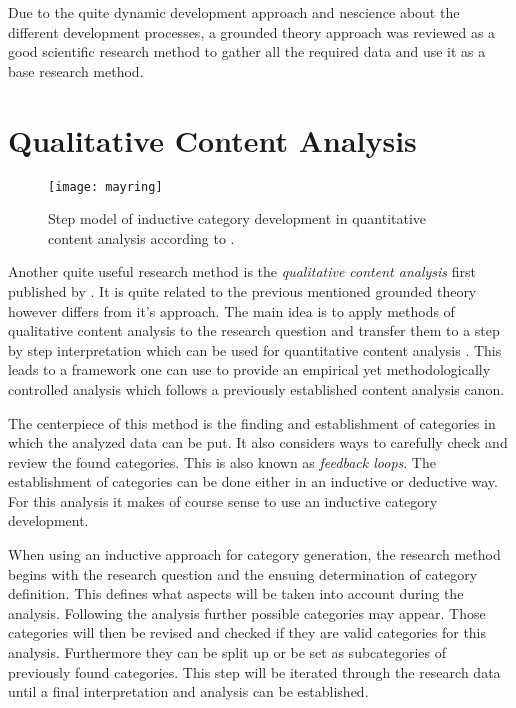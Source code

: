 Due to the quite dynamic development approach and nescience about the different
development processes, a grounded theory approach was reviewed as a good
scientific research method to gather all the required data and use it as a base
research method.


\section{Qualitative Content Analysis} %

\begin{figure}[htbp]
  \centering
  \texttt{[image: mayring]}
  \caption{Step model of inductive category development in quantitative content
    analysis according to \citeauthor{Mayring2008} \cite{Mayring2000,Mayring2008}.}
\end{figure}

Another quite useful research method is the \emph{qualitative content analysis}
first published by \textcite{Mayring2008}. It is quite related to the previous
mentioned grounded theory however differs from it's approach. The main idea is
to apply methods of qualitative content analysis to the research question and
transfer them to a step by step interpretation which can be used for
quantitative content analysis \cite{Mayring2000}. This leads to a framework one
can use to provide an empirical yet methodologically controlled analysis which
follows a previously established content analysis canon.

The centerpiece of this method is the finding and establishment of categories
in which the analyzed data can be put. It also considers ways to carefully
check and review the found categories. This is also known as \emph{feedback
loops}. The establishment of categories can be done either in an inductive or
deductive way. For this analysis it makes of course sense to use an inductive
category development.

When using an inductive approach for category generation, the research method
begins with the research question and the ensuing determination of category
definition. This defines what aspects will be taken into account during the
analysis. Following the analysis further possible categories may appear. Those
categories will then be revised and checked if they are valid categories for
this analysis. Furthermore they can be split up or be set as subcategories of
previously found categories. This step will be iterated through the research
data until a final interpretation and analysis can be established.

